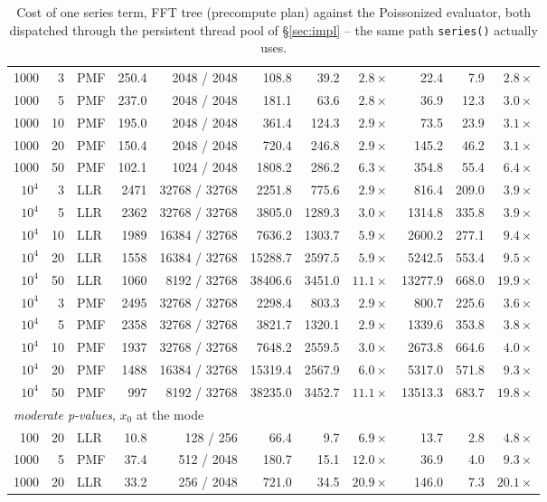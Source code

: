 \documentclass[11pt]{article}
\begin{document}
\begin{table}[tp]
\begin{tabular}{rrlrrrrrrrr}
1000 & 3  & PMF & 250.4 & 2048 / 2048 & 108.8  & 39.2  & $2.8\times$ & 22.4   & 7.9   & $2.8\times$ \\
1000 & 5  & PMF & 237.0 & 2048 / 2048 & 181.1  & 63.6  & $2.8\times$ & 36.9   & 12.3  & $3.0\times$ \\
1000 & 10 & PMF & 195.0 & 2048 / 2048 & 361.4  & 124.3 & $2.9\times$ & 73.5   & 23.9  & $3.1\times$ \\
1000 & 20 & PMF & 150.4 & 2048 / 2048 & 720.4  & 246.8 & $2.9\times$ & 145.2  & 46.2  & $3.1\times$ \\
1000 & 50 & PMF & 102.1 & 1024 / 2048 & 1808.2 & 286.2 & $6.3\times$ & 354.8  & 55.4  & $6.4\times$ \\
\midrule
$10^4$ & 3  & LLR & 2471 & 32768 / 32768 & 2251.8  & 775.6  & $2.9\times$  & 816.4   & 209.0  & $3.9\times$ \\
$10^4$ & 5  & LLR & 2362 & 32768 / 32768 & 3805.0  & 1289.3 & $3.0\times$  & 1314.8  & 335.8  & $3.9\times$ \\
$10^4$ & 10 & LLR & 1989 & 16384 / 32768 & 7636.2  & 1303.7 & $5.9\times$  & 2600.2  & 277.1  & $9.4\times$ \\
$10^4$ & 20 & LLR & 1558 & 16384 / 32768 & 15288.7 & 2597.5 & $5.9\times$  & 5242.5  & 553.4  & $9.5\times$ \\
$10^4$ & 50 & LLR & 1060 & 8192 / 32768  & 38406.6 & 3451.0 & $11.1\times$ & 13277.9 & 668.0  & $19.9\times$ \\
$10^4$ & 3  & PMF & 2495 & 32768 / 32768 & 2298.4  & 803.3  & $2.9\times$  & 800.7   & 225.6  & $3.6\times$ \\
$10^4$ & 5  & PMF & 2358 & 32768 / 32768 & 3821.7  & 1320.1 & $2.9\times$  & 1339.6  & 353.8  & $3.8\times$ \\
$10^4$ & 10 & PMF & 1937 & 32768 / 32768 & 7648.2  & 2559.5 & $3.0\times$  & 2673.8  & 664.6  & $4.0\times$ \\
$10^4$ & 20 & PMF & 1488 & 16384 / 32768 & 15319.4 & 2567.9 & $6.0\times$  & 5317.0  & 571.8  & $9.3\times$ \\
$10^4$ & 50 & PMF & 997  & 8192 / 32768  & 38235.0 & 3452.7 & $11.1\times$ & 13513.3 & 683.7  & $19.8\times$ \\
\midrule
\multicolumn{11}{l}{\emph{moderate p-values}, $x_0$ at the mode} \\
100  & 20 & LLR & 10.8  & 128 / 256   & 66.4   & 9.7   & $6.9\times$  & 13.7   & 2.8   & $4.8\times$ \\
1000 & 5  & PMF & 37.4  & 512 / 2048  & 180.7  & 15.1  & $12.0\times$ & 36.9   & 4.0   & $9.3\times$ \\
1000 & 20 & LLR & 33.2  & 256 / 2048  & 721.0  & 34.5  & $20.9\times$ & 146.0  & 7.3   & $20.1\times$ \\
\bottomrule
\end{tabular}
\caption{Cost of one series term, FFT tree (precompute plan) against the Poissonized evaluator,
both dispatched through the persistent thread pool of \S\ref{sec:impl} -- the same path
\texttt{series()} actually uses.}
\label{tab:thru}
\end{table}
\end{document}

